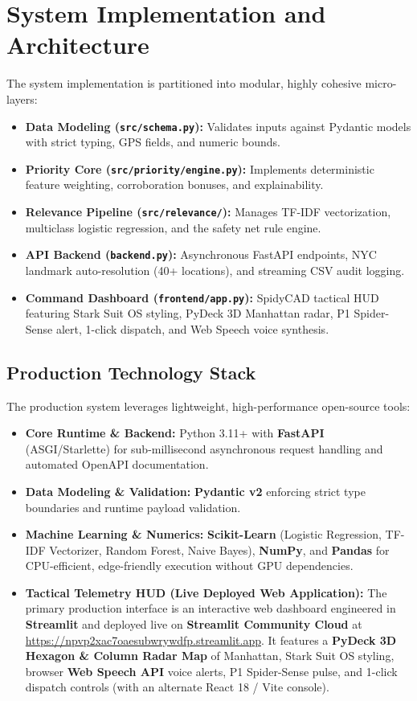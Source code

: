 \documentclass[10pt,a4paper]{article}
\begin{document}
\section{System Implementation and Architecture}
The system implementation is partitioned into modular, highly cohesive micro-layers:
\begin{itemize}
  \item \textbf{Data Modeling (\texttt{src/schema.py}):} Validates inputs against Pydantic models with strict typing, GPS fields, and numeric bounds.
  \item \textbf{Priority Core (\texttt{src/priority/engine.py}):} Implements deterministic feature weighting, corroboration bonuses, and explainability.
  \item \textbf{Relevance Pipeline (\texttt{src/relevance/}):} Manages TF-IDF vectorization, multiclass logistic regression, and the safety net rule engine.
  \item \textbf{API Backend (\texttt{backend.py}):} Asynchronous FastAPI endpoints, NYC landmark auto-resolution (40+ locations), and streaming CSV audit logging.
  \item \textbf{Command Dashboard (\texttt{frontend/app.py}):} SpidyCAD tactical HUD featuring Stark Suit OS styling, PyDeck 3D Manhattan radar, P1 Spider-Sense alert, 1-click dispatch, and Web Speech voice synthesis.
\end{itemize}

\subsection{Production Technology Stack}
The production system leverages lightweight, high-performance open-source tools:
\begin{itemize}
  \item \textbf{Core Runtime \& Backend:} Python 3.11+ with \textbf{FastAPI} (ASGI/Starlette) for sub-millisecond asynchronous request handling and automated OpenAPI documentation.
  \item \textbf{Data Modeling \& Validation:} \textbf{Pydantic v2} enforcing strict type boundaries and runtime payload validation.
  \item \textbf{Machine Learning \& Numerics:} \textbf{Scikit-Learn} (Logistic Regression, TF-IDF Vectorizer, Random Forest, Naive Bayes), \textbf{NumPy}, and \textbf{Pandas} for CPU-efficient, edge-friendly execution without GPU dependencies.
  \item \textbf{Tactical Telemetry HUD (Live Deployed Web Application):} The primary production interface is an interactive web dashboard engineered in \textbf{Streamlit} and deployed live on \textbf{Streamlit Community Cloud} at \url{https://npvp2xac7oaesubwrywdfp.streamlit.app}. It features a \textbf{PyDeck 3D Hexagon \& Column Radar Map} of Manhattan, Stark Suit OS styling, browser \textbf{Web Speech API} voice alerts, P1 Spider-Sense pulse, and 1-click dispatch controls (with an alternate React 18 / Vite console).
\end{itemize}
\end{document}
